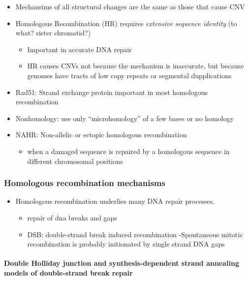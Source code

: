 \documentclass[]{book}
\providecommand{\tightlist}{%
  \setlength{\itemsep}{0pt}\setlength{\parskip}{0pt}}
\let\oldparagraph\paragraph
\renewcommand{\paragraph}[1]{\oldparagraph{#1}\mbox{}}
\begin{document}
\begin{itemize}
\tightlist
\item
  Mechansims of all structural changes are the same as those that cause CNV
\item
  Homologous Recombination (HR) requires \emph{extensive sequence identity} (to what? sister chromatid?)

  \begin{itemize}
  \tightlist
  \item
    Important in accurate DNA repair
  \item
    HR causes CNVs not because the mechanism is inaccurate, but because genomes have tracts of low copy repeats or segmental dupplications
  \end{itemize}
\item
  Rad51: Strand exchange protein important in most homologous recombination
\item
  Nonhomology: use only ``microhomology'' of a few bases or no homology
\item
  NAHR: Non-allelic or ectopic homologous recombination

  \begin{itemize}
  \tightlist
  \item
    when a damaged sequence is repaired by a homologous sequence in different chromosomal positions
  \end{itemize}
\end{itemize}

\hypertarget{homologous-recombination-mechanisms}{%
\subsubsection{Homologous recombination mechanisms}\label{homologous-recombination-mechanisms}}

\begin{itemize}
\tightlist
\item
  Homologous recombination underlies many DNA repair processes.

  \begin{itemize}
  \tightlist
  \item
    repair of dna breaks and gaps
  \item
    DSB: double-strand break induced recombination
    -Spontaneous mitotic recombination is probably initionated by single strand DNA gaps
  \end{itemize}
\end{itemize}

\hypertarget{double-holliday-junction-and-synthesis-dependent-strand-annealing-models-of-double-strand-break-repair}{%
\paragraph{Double Holliday junction and synthesis-dependent strand annealing models of double-strand break repair}\label{double-holliday-junction-and-synthesis-dependent-strand-annealing-models-of-double-strand-break-repair}}
\end{document}
